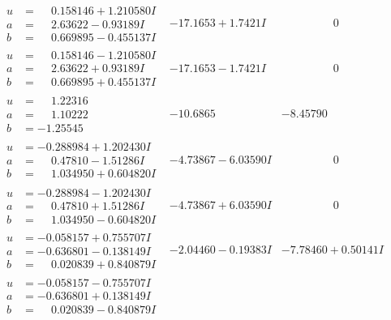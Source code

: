\documentclass[1p]{elsarticle_modified}
\theoremstyle{definition}
\begin{document}
$$\begin{array}{c|c|c}
\begin{aligned}
u &= \phantom{-}0.158146 + 1.210580 I \\
a &= \phantom{-}2.63622 - 0.93189 I \\
b &= \phantom{-}0.669895 - 0.455137 I\end{aligned}
 & -17.1653 + 1.7421 I & \phantom{-0.000000 } 0 \\ \hline\begin{aligned}
u &= \phantom{-}0.158146 - 1.210580 I \\
a &= \phantom{-}2.63622 + 0.93189 I \\
b &= \phantom{-}0.669895 + 0.455137 I\end{aligned}
 & -17.1653 - 1.7421 I & \phantom{-0.000000 } 0 \\ \hline\begin{aligned}
u &= \phantom{-}1.22316\phantom{ +0.000000I} \\
a &= \phantom{-}1.10222\phantom{ +0.000000I} \\
b &= -1.25545\phantom{ +0.000000I}\end{aligned}
 & -10.6865\phantom{ +0.000000I} & -8.45790\phantom{ +0.000000I} \\ \hline\begin{aligned}
u &= -0.288984 + 1.202430 I \\
a &= \phantom{-}0.47810 - 1.51286 I \\
b &= \phantom{-}1.034950 + 0.604820 I\end{aligned}
 & -4.73867 - 6.03590 I & \phantom{-0.000000 } 0 \\ \hline\begin{aligned}
u &= -0.288984 - 1.202430 I \\
a &= \phantom{-}0.47810 + 1.51286 I \\
b &= \phantom{-}1.034950 - 0.604820 I\end{aligned}
 & -4.73867 + 6.03590 I & \phantom{-0.000000 } 0 \\ \hline\begin{aligned}
u &= -0.058157 + 0.755707 I \\
a &= -0.636801 - 0.138149 I \\
b &= \phantom{-}0.020839 + 0.840879 I\end{aligned}
 & -2.04460 - 0.19383 I & -7.78460 + 0.50141 I \\ \hline\begin{aligned}
u &= -0.058157 - 0.755707 I \\
a &= -0.636801 + 0.138149 I \\
b &= \phantom{-}0.020839 - 0.840879 I\end{aligned}

\end{array}$$
\end{document}
